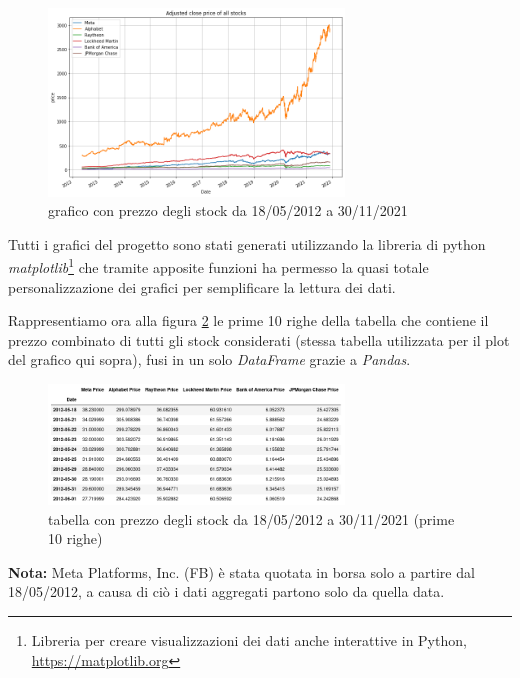 \documentclass{article}
\begin{document}
\begin{figure}[h]
  \centering
  \includegraphics[width=0.7\textwidth]{all_stocks_price.png}
  \caption{grafico con prezzo degli stock da 18/05/2012 a 30/11/2021}
  \label{fig:all_stocks_price}
\end{figure}

Tutti i grafici del progetto sono stati generati utilizzando la libreria di python \emph{matplotlib}\footnote{Libreria per creare visualizzazioni dei dati anche interattive in Python, \href{https://matplotlib.org}{https://matplotlib.org}}
che tramite apposite funzioni ha permesso la quasi totale personalizzazione dei grafici per semplificare la lettura dei dati.

Rappresentiamo ora alla figura \ref{fig:all_stocks_table_10} le prime 10 righe della tabella che contiene il prezzo combinato di tutti gli stock considerati (stessa tabella utilizzata per il plot del grafico qui sopra), 
fusi in un solo \emph{DataFrame} grazie a \emph{Pandas}.

\begin{figure}[h]
  \centering
  \includegraphics[width=0.7\textwidth]{stocks_combined_first_10.png}
  \caption{tabella con prezzo degli stock da 18/05/2012 a 30/11/2021 (prime 10 righe)}
  \label{fig:all_stocks_table_10}
\end{figure}

\textbf{Nota:} Meta Platforms, Inc. (FB) è stata quotata in borsa solo a partire dal 18/05/2012, a causa di ciò i dati aggregati partono
solo da quella data.

\end{document}
